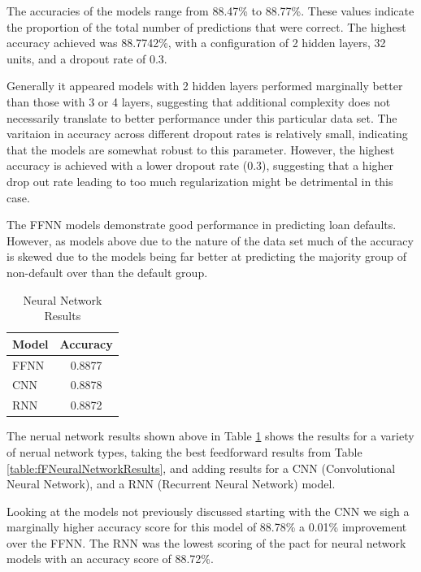 \documentclass[12pt]{article}
\begin{document}
The accuracies of the models range from 88.47\% to 88.77\%. These values indicate the proportion of the total number of predictions that were correct. The highest accuracy achieved was 88.7742\%, with a configuration of 2 hidden layers, 32 units, and a dropout rate of 0.3. 

Generally it appeared models with 2 hidden layers performed marginally better than those with 3 or 4 layers, suggesting that additional complexity does not necessarily translate to better performance under this particular data set. The varitaion in accuracy across different dropout rates is relatively small, indicating that the models are somewhat robust to this parameter. However, the highest accuracy is achieved with a lower dropout rate (0.3), suggesting that a higher drop out rate leading to too much regularization might be detrimental in this case.

The FFNN models demonstrate good performance in predicting loan defaults. However, as models above due to the nature of the data set much of the accuracy is skewed due to the models being far better at predicting the majority group of non-default over than the default group.

\begin{table}[htbp]
    \centering
    \caption{Neural Network Results}
    \begin{tabular}{lc}
        \toprule
        Model & Accuracy \\
        \midrule
        FFNN & 0.8877 \\
        CNN & 0.8878 \\
        RNN & 0.8872 \\
        \bottomrule
    \end{tabular}
    \label{table:neuralNetworkResults}
\end{table}

The nerual network results shown above in Table \ref{table:neuralNetworkResults} shows the results for a variety of nerual network types, taking the best feedforward results from Table \ref{table:fFNeuralNetworkResults}, and adding results for a CNN (Convolutional Neural Network), and a RNN (Recurrent Neural Network) model.

Looking at the models not previously discussed starting with the CNN we sigh a marginally higher accuracy score for this model of 88.78\% a 0.01\% improvement over the FFNN. The RNN was the lowest scoring of the pact for neural network models with an accuracy score of 88.72\%.
\end{document}
